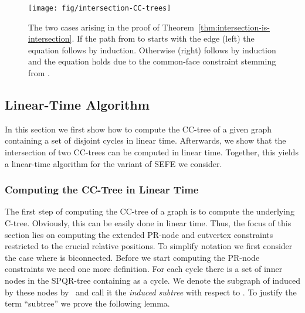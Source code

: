 \documentclass{scrartcl}
\renewcommand{\todo}[1]{}
\newcommand{\1}[1]{{\normalfont \ensuremath{#1^{\tiny\circled{1}}}}} \newcommand{\2}[1]{{\normalfont \ensuremath{#1^{\tiny\circled{2}}}}} \renewcommand{\k}[1]{{\normalfont \ensuremath{#1^{\tiny\circled{k}}}}} \newcommand{\proj}[2]{\ensuremath{\left.#1\right|_{#2}}} \newcommand{\eps}{\varepsilon}
\theoremstyle{plain} \newtheorem{theorem}{Theorem} \newcounter{lemmacounter} \setcounter{lemmacounter}{0} \newtheorem{lemma}[lemmacounter]{Lemma} \newtheorem{fact}{Fact}  \newtheorem{corollary}{Corollary} \theoremstyle{definition} \newtheorem{definition}{Definition}
\begin{document}
\begin{figure}
  \centering
  \texttt{[image: fig/intersection-CC-trees]}
  \caption{The two cases arising in the proof of
    Theorem~\ref{thm:intersection-is-intersection}.  If the path from
     to  starts with the edge  (left) the
    equation  follows by
    induction.  Otherwise (right)  follows by induction and the equation
     holds due to the
    common-face constraint stemming from .}
  \label{fig:intersection-CC-trees}
\end{figure}

\subsection{Linear-Time Algorithm}
\label{sec:line-time-algor}

In this section we first show how to compute the CC-tree of a given
graph containing a set of disjoint cycles in linear time.  Afterwards,
we show that the intersection of two CC-trees can be computed in
linear time.  Together, this yields a linear-time algorithm for the
variant of {\sc SEFE} we consider.

\subsubsection*{Computing the CC-Tree in Linear Time}
\label{sec:computing-cc-tree}

\todo{Pag 15, line 1 of ``Computing...time'':}The first step of
computing the CC-tree  of a graph  is to
compute the underlying C-tree.  Obviously, this can be easily done in
linear time.  Thus, the focus of this section lies on computing the
extended PR-node and cutvertex constraints restricted to the crucial
relative positions.  To simplify notation we first consider the case
where  is biconnected.  Before we start computing the PR-node
constraints we need one more definition.  For each cycle  there is
a set of inner nodes in the SPQR-tree  containing  as a
cycle.  We denote the subgraph of  induced by these nodes
by~ and call it the \emph{induced subtree} with
respect to .  To justify the term ``subtree'' we prove the
following lemma.
\end{document}

